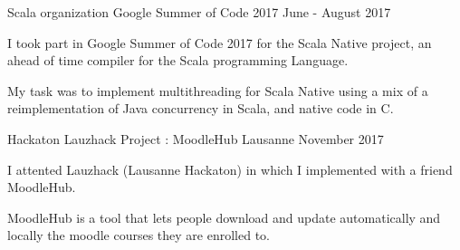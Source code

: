 \begin{cventries}

\cventry
{Scala organization} %
{Google Summer of Code 2017} %
{} %
{June - August 2017} %
{ %
\begin{cvitems}
\item {I took part in Google Summer of Code 2017 for the Scala Native project, an ahead of time compiler for the Scala programming Language.}
\item {My task was to implement multithreading for Scala Native using a mix of a reimplementation of Java concurrency in Scala, and native code in C.}
\end{cvitems}
}


\cventry
{Hackaton} %
{Lauzhack Project : MoodleHub} %
{Lausanne} %
{November 2017} %
{ %
	\begin{cvitems}
		\item {I attented Lauzhack (Lausanne Hackaton) in which I implemented with a friend MoodleHub.}
		\item {MoodleHub is a tool that lets people download and update automatically and locally the moodle courses they are enrolled to.}
	\end{cvitems}
}






\end{cventries}